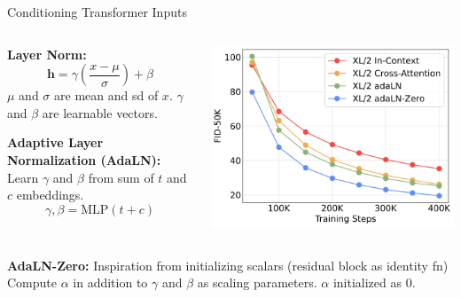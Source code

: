 \documentclass{beamer}
\begin{document}
\begin{frame}[t]{Conditioning Transformer Inputs}
    \vspace{-1em}
	\begin{columns}[t]
		\begin{column}{.5\textwidth}
            \textbf{Layer Norm:}
            \[\textbf{h} = \gamma (\frac{x - \mu}{\sigma}) + \beta\]
            $\mu$ and $\sigma$ are mean and sd of $x$. $\gamma$ and $\beta$ are learnable vectors.

            \textbf{Adaptive Layer Normalization (AdaLN):} \newline
            Learn $\gamma$ and $\beta$ from sum of $t$ and $c$ embeddings.
            \[\gamma, \beta = \text{MLP}(t + c)\]
		\end{column}
		\begin{column}{.5\textwidth}
            \begin{center}
                \includegraphics[width=1.0\textwidth]{./img/diff_arch_norm.png}
            \end{center}
		\end{column}
	\end{columns}
    \vspace{1em}


    
    \textbf{AdaLN-Zero:}
    Inspiration from initializing scalars (residual block as identity fn)
    \newline
    Compute $\alpha$ in addition to $\gamma$ and $\beta$ as scaling parameters.\newline
    $\alpha$ initialized as 0.
\end{frame}
\end{document}
